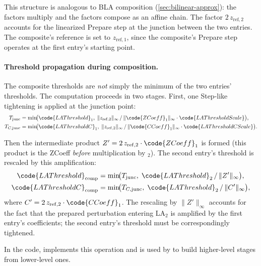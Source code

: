 This structure is analogous to BLA composition (\cref{sec:bilinear-approx}):
the  factors multiply and the  factors compose
as an affine chain.  The factor \(2\,z_\mathrm{ref,2}\) accounts for
the linearized Prepare step at the junction between the two entries.
The composite's reference is set to \(z_\mathrm{ref,1}\), since the
composite's Prepare step operates at the first entry's starting point.

\paragraph{Threshold propagation during composition.}
The composite thresholds are \emph{not} simply the minimum of the two
entries' thresholds.  The computation proceeds in two stages.  First,
one Step-like tightening is applied at the junction point:
\begin{align}
T_\mathrm{junc}
  &= \min\!\bigl(
       \code{LAThreshold}_1,\;
       \lVert z_\mathrm{ref,2} \rVert_\infty
       \,/\, \lVert \code{ZCoeff}_1 \rVert_\infty
       \cdot \code{LAThresholdScale}
     \bigr),
\label{eq:la-comp-thresh-junc}
\\
T_{C,\mathrm{junc}}
  &= \min\!\bigl(
       \code{LAThresholdC}_1,\;
       \lVert z_\mathrm{ref,2} \rVert_\infty
       \,/\, \lVert \code{CCoeff}_1 \rVert_\infty
       \cdot \code{LAThresholdCScale}
     \bigr).
\end{align}

Then the intermediate product
\(Z' = 2\,z_\mathrm{ref,2} \cdot \code{ZCoeff}_1\) is formed
(this product is the ZCoeff \emph{before} multiplication by \(_2\)).
The second entry's threshold is rescaled by this amplification:
\begin{align}
\code{LAThreshold}_\mathrm{comp}
  &= \min\!\bigl(
       T_\mathrm{junc},\;
       \code{LAThreshold}_2 \,/\, \lVert Z' \rVert_\infty
     \bigr),
\\
\code{LAThresholdC}_\mathrm{comp}
  &= \min\!\bigl(
       T_{C,\mathrm{junc}},\;
       \code{LAThreshold}_2 \,/\, \lVert C' \rVert_\infty
     \bigr),
\end{align}
where \(C' = 2\,z_\mathrm{ref,2} \cdot \code{CCoeff}_1\).
The rescaling by \(\lVert Z' \rVert_\infty\) accounts for the fact that
the prepared perturbation entering LA\(_2\) is amplified by the first
entry's coefficients; the second entry's threshold must be correspondingly
tightened.

In the code,  implements this operation and
is used by  to build higher-level stages from
lower-level ones.

